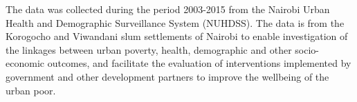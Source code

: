 \documentclass[12pt]{article}
\begin{document}
The data was collected during the period 2003-2015 from the Nairobi Urban Health and Demographic Surveillance System (NUHDSS). The data is from the Korogocho and Viwandani slum settlements of Nairobi to enable investigation of the linkages between urban poverty, health, demographic and other socio-economic outcomes, and facilitate the evaluation of interventions implemented by government and other development partners to improve the wellbeing of the urban poor. 


%
%
%
\end{document}
